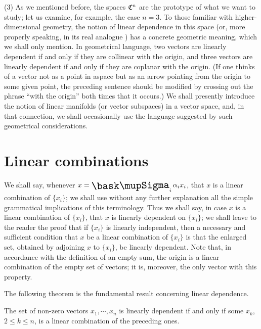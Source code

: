 (3) As we mentioned before, the spaces \(\frak{C}^n\) are the prototype of what
we want to study; let us examine, for example, the case \(n = 3\). To those
familiar with higher-dimensional geometry, the notion of linear dependence in
this space (or, more properly speaking, in its real analogue ) has a concrete
geometric meaning, which we shall only mention. In geometrical language, two
vectors are linearly dependent if and only if they are collinear with the
origin, and three vectors are linearly dependent if and only if they are
coplanar with the origin. (If one thinks of a vector not as a point in aspace
but as an arrow pointing from the origin to some given point, the preceding
sentence should be modified by crossing out the phrase ``with the origin'' both
times that it occurs.) We shall presently introduce the notion of linear
manifolds (or vector subspaces) in a vector space, and, in that connection, we
shall occasionally use the language suggested by such geometrical
considerations.

\section{Linear combinations}

We shall say, whenever \(x = \sumx_i \alpha_i x_i\), that \(x\) is a linear
combination of \(\{x_i\}\); we shall use without any further explanation all the
simple grammatical implications of this terminology. Thus we shall say, in case
\(x\) is a linear combination of \(\{x_i\}\), that \(x\) is linearly dependent
on \(\{x_i\}\); we shall leave to the reader the proof that if \(\{x_i\}\) is
linearly independent, then a necessary and sufficient condition that \(x\) be a
linear combination of \(\{x_i\}\) is that the enlarged set, obtained by
adjoining \(x\) to \(\{x_i\}\), be linearly dependent. Note that, in accordance
with the definition of an empty sum, the origin is a linear combination of the
empty set of vectors; it is, moreover, the only vector with this property.

The following theorem is the fundamental result concerning linear dependence.

\begin{theorem}
    The set of non-zero vectors \(x_1,\cdots,x_n\) is linearly dependent if and only if some \(x_k\), \(2\leq k\leq n\), is a linear combination of the preceding ones.
\end{theorem}

